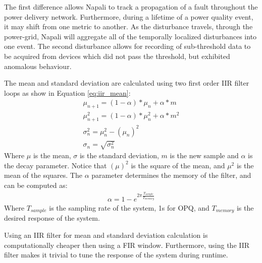 The first difference allows Napali to track a propagation of a fault throughout the power delivery network.
Furthermore, during a lifetime of a power quality event, it may shift from one metric to another.
As the disturbance travels, through the power-grid, Napali will aggregate all of the temporally localized disturbances into one event.
The second disturbance allows for recording of sub-threshold data to be acquired from devices which did not pass the threshold, but exhibited anomalous behaviour.

The mean and standard deviation are calculated using two first order IIR filter loops as show in Equation \ref{eq:iir_mean}:
\begin{equation}\label{eq:iir_mean}
\begin{aligned}
	\mu_{n+1} = (1- \alpha)*\mu_{n} + \alpha * m \\
	\mu^2_{n+1} = (1- \alpha)*\mu^2_n + \alpha * m^2 \\
	\sigma^2_n = \mu^2_n - (\mu_n)^2 \\
	\sigma_n =\sqrt{\sigma_n^2}
\end{aligned}
\end{equation}
Where $\mu$ is the mean, $\sigma$ is the standard deviation, $m$ is the new sample and $\alpha$ is the decay parameter.
Notice that $(\mu)^2$ is the square of the mean, and $\mu^2$ is the mean of the squares.
The $\alpha$ parameter determines the memory of the filter, and can be computed as:
\begin{equation}\label{eq:iir_alpha}
\begin{aligned}
	\alpha = 1 - e^{2\pi\frac{T_{sample}}{T_{memory}}}
\end{aligned}
\end{equation}
Where $T_{sample}$ is the sampling rate of the system, 1s for OPQ, and $T_{memory}$ is the desired response of the system.

Using an IIR filter for mean and standard deviation calculation is computationally cheaper then using a FIR window.
Furthermore, using the IIR filter makes it trivial to tune the response of the system during runtime.

